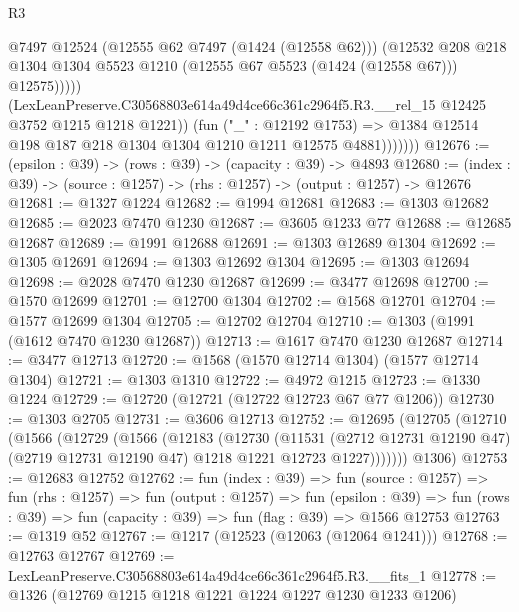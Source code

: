 \begin{lexlean}{R3}
\begin{coremodule}
                          @7497
                          @12524
                          (@12555 @62 @7497 (@1424 (@12558 @62)))
                          (@12532
                            @208
                            @218
                            @1304
                            @1304
                            @5523
                            @1210
                            (@12555 @67 @5523 (@1424 (@12558 @67)))
                            @12575)))))
                  (LexLeanPreserve.C30568803e614a49d4ce66c361c2964f5.R3.__rel_15
                    @12425
                    @3752
                    @1215
                    @1218
                    @1221))
                (fun ("_" : @12192 @1753) =>
                @1384 @12514 @198 @187 @218 @1304 @1304 @1210 @1211 @12575 @4881)))))))
@12676 := (epsilon : @39) -> (rows : @39) -> (capacity : @39) -> @4893
@12680 := (index : @39) -> (source : @1257) -> (rhs : @1257) -> (output : @1257) -> @12676
@12681 := @1327 @1224
@12682 := @1994 @12681
@12683 := @1303 @12682
@12685 := @2023 @7470 @1230
@12687 := @3605 @1233 @77
@12688 := @12685 @12687
@12689 := @1991 @12688
@12691 := @1303 @12689 @1304
@12692 := @1305 @12691
@12694 := @1303 @12692 @1304
@12695 := @1303 @12694
@12698 := @2028 @7470 @1230 @12687
@12699 := @3477 @12698
@12700 := @1570 @12699
@12701 := @12700 @1304
@12702 := @1568 @12701
@12704 := @1577 @12699 @1304
@12705 := @12702 @12704
@12710 := @1303 (@1991 (@1612 @7470 @1230 @12687))
@12713 := @1617 @7470 @1230 @12687
@12714 := @3477 @12713
@12720 := @1568 (@1570 @12714 @1304) (@1577 @12714 @1304)
@12721 := @1303 @1310
@12722 := @4972 @1215
@12723 := @1330 @1224
@12729 := @12720 (@12721 (@12722 @12723 @67 @77 @1206))
@12730 := @1303 @2705
@12731 := @3606 @12713
@12752 := @12695
    (@12705
      (@12710
        (@1566
          (@12729
            (@1566
              (@12183
                (@12730
                  (@11531
                    (@2712 @12731 @12190 @47)
                    (@2719 @12731 @12190 @47)
                    @1218
                    @1221
                    @12723
                    @1227)))))))
      @1306)
@12753 := @12683 @12752
@12762 := fun (index : @39) =>
  fun (source : @1257) =>
  fun (rhs : @1257) =>
  fun (output : @1257) =>
  fun (epsilon : @39) =>
  fun (rows : @39) => fun (capacity : @39) => fun (flag : @39) => @1566 @12753
@12763 := @1319 @52
@12767 := @1217 (@12523 (@12063 (@12064 @1241)))
@12768 := @12763 @12767
@12769 := LexLeanPreserve.C30568803e614a49d4ce66c361c2964f5.R3.__fits_1
@12778 := @1326 (@12769 @1215 @1218 @1221 @1224 @1227 @1230 @1233 @1206)

\end{coremodule}
\end{lexlean}
